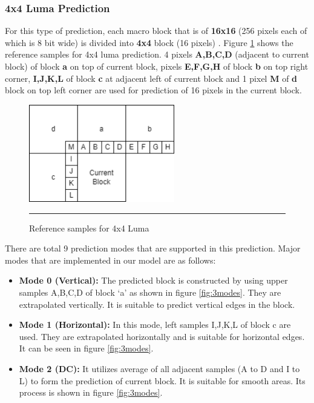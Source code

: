 \subsubsection{4x4 Luma Prediction}
For this type of prediction, each macro block that is of \textbf{16x16} (256 pixels each of which is 8 bit wide) is divided into \textbf{4x4} block (16 pixels) \cite{anilkumar2021intra}. Figure \ref{fig:4x4xluma} shows the reference samples for 4x4 luma prediction. 4 pixels \textbf{A,B,C,D} (adjacent to current block) of block \textbf{a}  on top of current block, pixels \textbf{E,F,G,H} of block \textbf{b} on top right corner, \textbf{I,J,K,L} of block \textbf{c} at adjacent left of current block and 1 pixel \textbf{M} of \textbf{d} block on top left corner are used for prediction of 16 pixels in the current block.

\begin{figure}[htbp]
	\centering
	\includegraphics[width = 2.5in]{./Figures/4x4luma.png}
	\rule{35em}{0.5pt}
	\caption{Reference samples for 4x4 Luma}
	\label{fig:4x4xluma}
\end{figure}

There are total 9 prediction modes that are supported in this prediction. Major modes that are implemented in our model are as follows:

\begin{itemize}
	\item \textbf{Mode 0 (Vertical):} The predicted block is constructed by using upper samples A,B,C,D of block ‘a’ as shown in figure \ref{fig:3modes}. They are extrapolated vertically. It is suitable to predict vertical edges in the block.
	\item \textbf{Mode 1 (Horizontal):} In this mode, left samples I,J,K,L of block c are used. They are extrapolated horizontally and is suitable for horizontal edges. It can be seen in figure \ref{fig:3modes}.
	\item \textbf{Mode 2 (DC):} It utilizes average of all adjacent samples (A to D and I to L) to form the prediction of current block. It is suitable for smooth areas. Its process is shown in figure \ref{fig:3modes}.

\end{itemize}
	 
